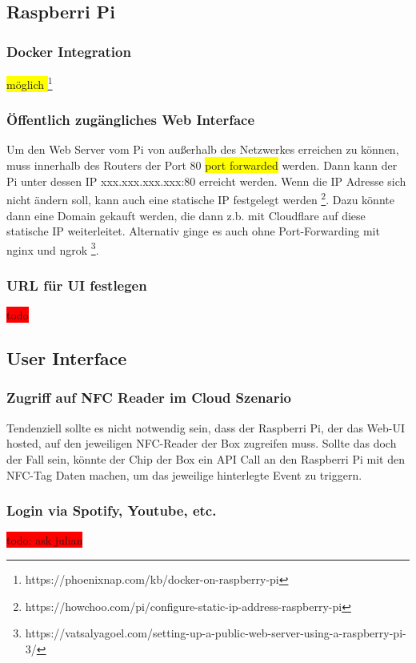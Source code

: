 \documentclass[10pt, a4paper, draft]{article}
\begin{document}
\subsection{Raspberri Pi}
\subsubsection{Docker Integration}
\colorbox{yellow}{möglich  }\footnote{https://phoenixnap.com/kb/docker-on-raspberry-pi}

\subsubsection{Öffentlich zugängliches Web Interface}
Um den Web Server vom Pi von außerhalb des Netzwerkes erreichen zu können, muss innerhalb des Routers der Port 80 \colorbox{yellow}{port forwarded} werden.
Dann kann der Pi unter dessen IP xxx.xxx.xxx.xxx:80 erreicht werden.
Wenn die IP Adresse sich nicht ändern soll, kann auch eine statische IP festgelegt werden \footnote{https://howchoo.com/pi/configure-static-ip-address-raspberry-pi}. Dazu könnte dann eine Domain gekauft werden, die dann z.b. mit Cloudflare auf diese statische IP weiterleitet.
Alternativ ginge es auch ohne Port-Forwarding mit nginx und ngrok \footnote{https://vatsalyagoel.com/setting-up-a-public-web-server-using-a-raspberry-pi-3/}.

\subsubsection{URL für UI festlegen}
\colorbox{red}{todo}

\subsection{User Interface}
\subsubsection{Zugriff auf NFC Reader im Cloud Szenario}
Tendenziell sollte es nicht notwendig sein, dass der Raspberri Pi, der das Web-UI hosted, auf den jeweiligen NFC-Reader der Box zugreifen muss.
Sollte das doch der Fall sein, könnte der Chip der Box ein API Call an den Raspberri Pi mit den NFC-Tag Daten machen, um das jeweilige hinterlegte Event zu triggern.

\subsubsection{Login via Spotify, Youtube, etc.}
\colorbox{red}{todo: ask julian}
\end{document}
